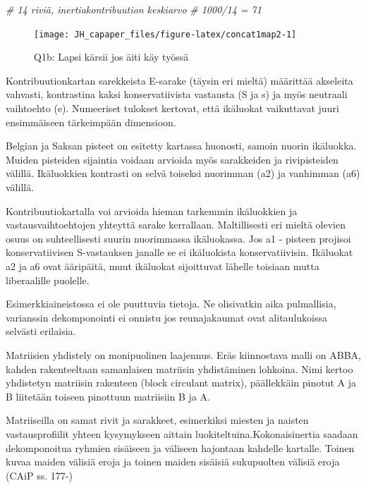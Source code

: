 \documentclass[
  finnish,
]{book}
\newenvironment{Shaded}{\begin{snugshade}}{\end{snugshade}}
\newcommand{\CommentTok}[1]{\textcolor[rgb]{0.56,0.35,0.01}{\textit{#1}}}
\begin{document}
\begin{Shaded}
\begin{Highlighting}[]
\CommentTok{# 14 riviä, inertiakontribuution keskiarvo}
\CommentTok{# 1000/14 = 71 }
\end{Highlighting}
\end{Shaded}

\begin{figure}

{\centering \texttt{[image: JH\_capaper\_files/figure-latex/concat1map2-1]} 

}

\caption{Q1b: Lapsi kärsii jos äiti käy työssä}\label{fig:concat1map2}
\end{figure}

Kontribuutionkartan sarekkeista E-sarake (täysin eri mieltä) määrittää akseleita
vahvasti, kontrastina kaksi konservatiivista vastausta (S ja s) ja myös
neutraali vaihtoehto (e). Numeeriset tulokset kertovat, että ikäluokat
vaikuttavat juuri ensimmäiseen tärkeimpään dimensioon.

Belgian ja Saksan pisteet on esitetty kartassa huonosti, samoin nuorin ikäluokka.
Muiden pisteiden sijaintia voidaan arvioida myös sarakkeiden ja rivipisteiden
välillä. Ikäluokkien kontrasti on selvä toiseksi nuorimman (a2) ja vanhimman (a6)
välillä.

Kontribuutiokartalla voi arvioida hieman tarkemmin ikäluokkien ja vastausvaihtoehtojen
yhteyttä sarake kerrallaan. Maltillisesti eri mieltä olevien osuus on suhteellisesti
suurin nuorimmassa ikäluokassa. Jos a1 - pisteen projisoi konservatiivisen
S-vastauksen janalle se ei ikäluokista konservatiivisin. Ikäluokat a2 ja a6 ovat
ääripäitä, muut ikäluokat sijoittuvat lähelle toisiaan mutta liberaalille puolelle.

Esimerkkiaineistossa ei ole puuttuvia tietoja. Ne olisivatkin
aika pulmallisia, varianssin dekomponointi ei onnistu jos reunajakaumat ovat
alitaulukoissa selvästi erilaisia.

Matriisien yhdistely on monipuolinen laajennus. Eräs kiinnostava malli on
ABBA, kahden rakenteeltaan samanlaisen matriisin yhdistäminen lohkoina. Nimi
kertoo yhdistetyn matriisin rakenteen (block circulant matrix),
päällekkäin pinotut A ja B liitetään toiseen pinottuun matriisiin B ja A.

Matriiseilla on samat rivit ja sarakkeet, esimerkiksi miesten ja naisten
vastausprofiilit yhteen kysymykseen aittain luokiteltuina.Kokonaisinertia
saadaan dekomponoitua ryhmien sisäiseen ja väliseen hajontaan kahdelle kartalle.
Toinen kuvaa maiden välisiä eroja ja toinen maiden sisäisiä sukupuolten välisiä
eroja (CAiP ss. 177-)
\end{document}
